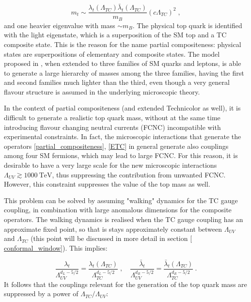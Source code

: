 \begin{equation}
m_t \sim \frac{\lambda_t(\Lambda_{TC}) \bar \lambda_t(\Lambda_{TC})}{m_B} (c \Lambda_{TC})^2 \; ,
\end{equation}
%
and one heavier eigenvalue with mass $\sim m_B$. The physical top quark is identified with the light eigenstate, which is a superposition of the SM top and a TC composite state. This is the reason for the name partial compositeness: physical states are superpositions of elementary and composite states. The model proposed in \cite{Kaplan:1991dc}, when extended to three families of SM quarks and leptons, is able to generate a large hierarchy of masses among the three families, having the first and second families much lighter than the third, even though a very general flavour structure is assumed in the underlying microscopic theory.

In the context of partial compositeness (and extended Technicolor as well), it is difficult to generate a realistic top quark mass, without at the same time introducing flavour changing neutral currents (FCNC) incompatible with experimental constraints. In fact, the microscopic interactions that generate the operators \ref{partial_compositeness}, \ref{ETC}  in general generate also couplings among four SM fermions, which may lead to large FCNC. For this reason, it is desirable to have a very large scale for the new microscopic interactions $\Lambda_{UV}  \gtrsim 1000 \: \mathrm{TeV}$, thus suppressing the contribution from unwanted FCNC. However, this constraint suppresses the value of the top mass as well. 

This problem can be solved by assuming "walking" dynamics for the TC gauge coupling, in combination with large anomalous dimensions for the composite operators. The walking dynamics is realised when the TC gauge coupling has an approximate fixed point, so that is stays approximately constant between $\Lambda_{UV}$ and $\Lambda_{TC}$ (this point will be discussed in more detail in section \ref{ conformal_window}). This implies:

\begin{equation}
\frac{\lambda_t}{\Lambda_{UV}^{d_L - 5/2}}  = \frac{\lambda_t(\Lambda_{TC})}{\Lambda_{TC}^{d_L - 5/2}} \; , \quad \frac{\bar \lambda_t}{\Lambda_{UV}^{d_R - 5/2}}  = \frac{\bar \lambda_t(\Lambda_{TC})}{\Lambda_{TC}^{d_R - 5/2}} \: .
\end{equation}
%
It follows that the couplings relevant for the generation of the top quark mass are suppressed by a power of $\Lambda_{TC}/\Lambda_{UV}$:

